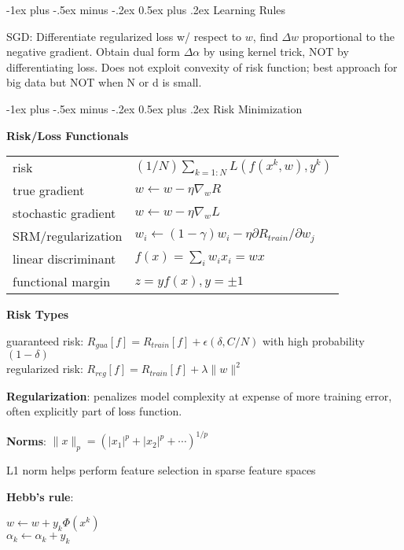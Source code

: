 \documentclass[10pt,landscape]{article}
\makeatletter
\renewcommand{\section}{\@startsection{section}{1}{0mm}%
                                {-1ex plus -.5ex minus -.2ex}%
                                {0.5ex plus .2ex}%
                                {\normalfont\large\bfseries}}
\makeatother
\begin{document}
\begin{multicols}{3}
\section{Learning Rules}

SGD: Differentiate regularized loss w/ respect to $w$, find $\Delta w$ proportional to the negative gradient. Obtain dual form $\Delta \alpha$ by using kernel trick, NOT by differentiating loss. Does not exploit convexity of risk function; best approach for big data but NOT when N or d is small.


\section{Risk Minimization}

\textbf{Risk/Loss Functionals}

\begin{tabular}{@{}ll@{}}
risk                    & $(1/N)\sum_{k=1:N} L(f(x^k, w), y^k)$ \\
true gradient           & $w \leftarrow w - \eta\nabla_w R$ \\
stochastic gradient     & $w \leftarrow w - \eta\nabla_w L$ \\
SRM/regularization      & $w_i \leftarrow (1 - \gamma) w_i - \eta \partial R_{train} / \partial w_j$ \\
linear discriminant     & $f(x) = \sum_i w_i x_i = wx$ \\
functional margin       & $z = y f(x), y=\pm 1$ \\
\end{tabular}

\textbf{Risk Types}

guaranteed risk: $R_{gua}[f] = R_{train}[f] + \epsilon (\delta, C/N)$ with high probability $(1-\delta)$ \\
regularized risk: $R_{reg}[f] = R_{train}[f] + \lambda \lVert w \rVert^2$

\textbf{Regularization}: penalizes model complexity at expense of more training error, often explicitly part of loss function.

\textbf{Norms}: $\lVert x \rVert_p = (|x_1|^p + |x_2|^p + \cdots)^{1/p}$

L1 norm helps perform feature selection in sparse feature spaces


                
\textbf{Hebb's rule}:

$w \leftarrow w + y_k \Phi(x^k)$ \\
$\alpha_k \leftarrow \alpha_k + y_k$


\end{multicols}
\end{document}
